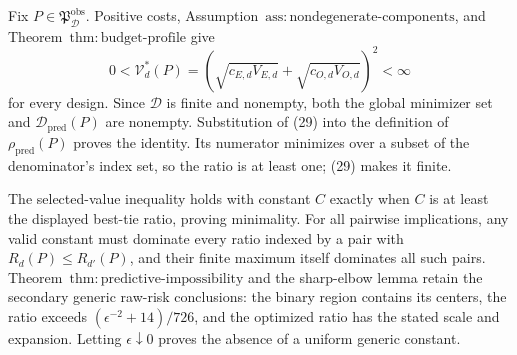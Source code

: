 Fix \(P\in\mathfrak P_{\mathcal D}^{\mathrm{obs}}\). Positive costs, Assumption~\(\mathrm{ass{:}nondegenerate\text{-}components}\), and Theorem~\(\mathrm{thm{:}budget\text{-}profile}\) give
\[
 0<\mathcal V_d^*(P)
 =\left(\sqrt{c_{E,d}V_{E,d}}+\sqrt{c_{O,d}V_{O,d}}\right)^2
 <\infty                                                     \tag{29}
\]
for every design. Since \(\mathcal D\) is finite and nonempty, both the global minimizer set and \(\mathcal D_{\mathrm{pred}}(P)\) are nonempty. Substitution of (29) into the definition of \(\rho_{\mathrm{pred}}(P)\) proves the identity. Its numerator minimizes over a subset of the denominator's index set, so the ratio is at least one; (29) makes it finite.

The selected-value inequality holds with constant \(C\) exactly when \(C\) is at least the displayed best-tie ratio, proving minimality. For all pairwise implications, any valid constant must dominate every ratio indexed by a pair with \(R_d(P)\le R_{d'}(P)\), and their finite maximum itself dominates all such pairs. Theorem~\(\mathrm{thm{:}predictive\text{-}impossibility}\) and the sharp-elbow lemma retain the secondary generic raw-risk conclusions: the binary region contains its centers, the ratio exceeds \((\epsilon^{-2}+14)/726\), and the optimized ratio has the stated scale and expansion. Letting \(\epsilon\downarrow0\) proves the absence of a uniform generic constant.